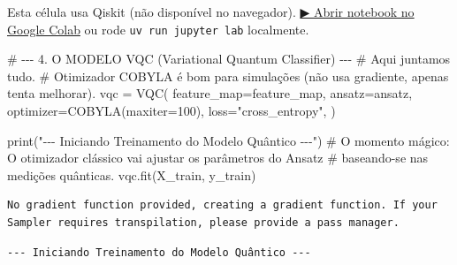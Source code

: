 \documentclass[
  brazilian,
]{report}
\newenvironment{Shaded}{\begin{snugshade}}{\end{snugshade}}
\newcommand{\BuiltInTok}[1]{\textcolor[rgb]{0.00,0.23,0.31}{#1}}
\newcommand{\CommentTok}[1]{\textcolor[rgb]{0.37,0.37,0.37}{#1}}
\newcommand{\DecValTok}[1]{\textcolor[rgb]{0.68,0.00,0.00}{#1}}
\newcommand{\NormalTok}[1]{\textcolor[rgb]{0.00,0.23,0.31}{#1}}
\newcommand{\OperatorTok}[1]{\textcolor[rgb]{0.37,0.37,0.37}{#1}}
\newcommand{\StringTok}[1]{\textcolor[rgb]{0.13,0.47,0.30}{#1}}
\begin{document}
\begin{tcolorbox}[enhanced jigsaw, arc=.35mm, bottomrule=.15mm, bottomtitle=1mm, breakable, colback=white, colbacktitle=quarto-callout-warning-color!10!white, colframe=quarto-callout-warning-color-frame, coltitle=black, left=2mm, leftrule=.75mm, opacityback=0, opacitybacktitle=0.6, rightrule=.15mm, title=\textcolor{quarto-callout-warning-color}{\faExclamationTriangle}\hspace{0.5em}{⚛️ Célula Qiskit --- execute no Colab ou localmente}, titlerule=0mm, toprule=.15mm, toptitle=1mm]

Esta célula usa Qiskit (não disponível no navegador).
\href{https://colab.research.google.com/github/maxwellamaral/aula-quantum/blob/main/notebooks/20-quantum-machine-learning.ipynb}{▶
Abrir notebook no Google Colab} ou rode \texttt{uv\ run\ jupyter\ lab}
localmente.

\begin{Shaded}
\begin{Highlighting}[]


\CommentTok{\# {-}{-}{-} 4. O MODELO VQC (Variational Quantum Classifier) {-}{-}{-}}
\CommentTok{\# Aqui juntamos tudo.}
\CommentTok{\# Otimizador COBYLA é bom para simulações (não usa gradiente, apenas tenta melhorar).}
\NormalTok{vqc }\OperatorTok{=}\NormalTok{ VQC(}
\NormalTok{    feature\_map}\OperatorTok{=}\NormalTok{feature\_map,}
\NormalTok{    ansatz}\OperatorTok{=}\NormalTok{ansatz,}
\NormalTok{    optimizer}\OperatorTok{=}\NormalTok{COBYLA(maxiter}\OperatorTok{=}\DecValTok{100}\NormalTok{),}
\NormalTok{    loss}\OperatorTok{=}\StringTok{"cross\_entropy"}\NormalTok{,}
\NormalTok{)}

\BuiltInTok{print}\NormalTok{(}\StringTok{"{-}{-}{-} Iniciando Treinamento do Modelo Quântico {-}{-}{-}"}\NormalTok{)}
\CommentTok{\# O momento mágico: O otimizador clássico vai ajustar os parâmetros do Ansatz}
\CommentTok{\# baseando{-}se nas medições quânticas.}
\NormalTok{vqc.fit(X\_train, y\_train)}
\end{Highlighting}
\end{Shaded}

\end{tcolorbox}

\begin{verbatim}
No gradient function provided, creating a gradient function. If your Sampler requires transpilation, please provide a pass manager.
\end{verbatim}

\begin{verbatim}
--- Iniciando Treinamento do Modelo Quântico ---
\end{verbatim}
\end{document}
